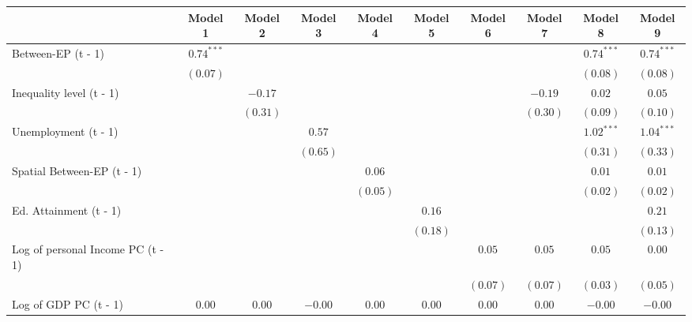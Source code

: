 
\begin{table}
\begin{center}
\begin{tabular}{l c c c c c c c c c}
\hline
 & Model 1 & Model 2 & Model 3 & Model 4 & Model 5 & Model 6 & Model 7 & Model 8 & Model 9 \\
\hline
Between-EP (t - 1)                & $0.74^{***}$ &          &          &          &          &          &          & $0.74^{***}$ & $0.74^{***}$ \\
                                  & $(0.07)$     &          &          &          &          &          &          & $(0.08)$     & $(0.08)$     \\
Inequality level (t - 1)          &              & $-0.17$  &          &          &          &          & $-0.19$  & $0.02$       & $0.05$       \\
                                  &              & $(0.31)$ &          &          &          &          & $(0.30)$ & $(0.09)$     & $(0.10)$     \\
Unemployment (t - 1)              &              &          & $0.57$   &          &          &          &          & $1.02^{***}$ & $1.04^{***}$ \\
                                  &              &          & $(0.65)$ &          &          &          &          & $(0.31)$     & $(0.33)$     \\
Spatial Between-EP (t - 1)        &              &          &          & $0.06$   &          &          &          & $0.01$       & $0.01$       \\
                                  &              &          &          & $(0.05)$ &          &          &          & $(0.02)$     & $(0.02)$     \\
Ed. Attainment (t - 1)            &              &          &          &          & $0.16$   &          &          &              & $0.21$       \\
                                  &              &          &          &          & $(0.18)$ &          &          &              & $(0.13)$     \\
Log of personal Income PC (t - 1) &              &          &          &          &          & $0.05$   & $0.05$   & $0.05$       & $0.00$       \\
                                  &              &          &          &          &          & $(0.07)$ & $(0.07)$ & $(0.03)$     & $(0.05)$     \\
Log of GDP PC (t - 1)             & $0.00$       & $0.00$   & $-0.00$  & $0.00$   & $0.00$   & $0.00$   & $0.00$   & $-0.00$      & $-0.00$      \\

\end{tabular}
\end{center}
\end{table}
